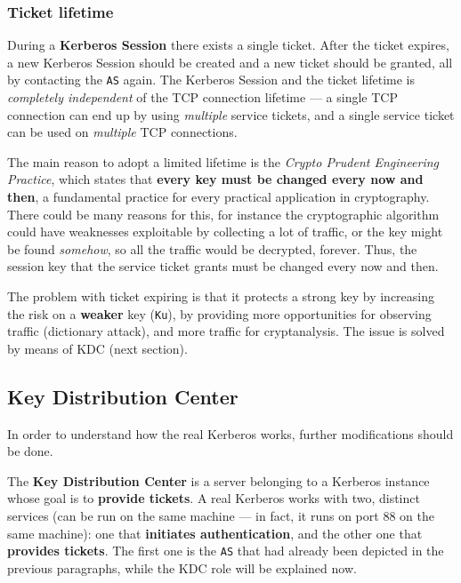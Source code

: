 \documentclass[10pt]{\classname}
\begin{document}
\subsubsection{Ticket lifetime}

During a \textbf{Kerberos Session} there exists a single ticket. After the
ticket expires, a new Kerberos Session should be created and a new ticket
should be granted, all by contacting the \texttt{AS} again. The Kerberos
Session and the ticket lifetime is \emph{completely independent} of the TCP
connection lifetime --- a single TCP connection can end up by using
\emph{multiple} service tickets, and a single service ticket can be used on
\emph{multiple} TCP connections.

The main reason to adopt a limited lifetime is the \emph{Crypto Prudent
Engineering Practice}, which states that \textbf{every key must be changed
every now and then}, a fundamental practice for every practical application in
cryptography. There could be many reasons for this, for instance the
cryptographic algorithm could have weaknesses exploitable by collecting a lot
of traffic, or the key might be found \emph{somehow}, so all the traffic would
be decrypted, forever. Thus, the session key that the service ticket grants
must be changed every now and then.

The problem with ticket expiring is that it protects a strong key by increasing
the risk on a \textbf{weaker} key (\texttt{Ku}), by providing more
opportunities for observing traffic (dictionary attack), and more traffic for
cryptanalysis. The issue is solved by means of KDC (next section).

\subsection{Key Distribution Center}

In order to understand how the real Kerberos works, further modifications
should be done.

The \textbf{Key Distribution Center} is a server belonging to a Kerberos instance
whose goal is to \textbf{provide tickets}. A real Kerberos works with two,
distinct services (can be run on the same machine --- in fact, it runs on port
88 on the same machine): one that \textbf{initiates authentication}, and the
other one that \textbf{provides tickets}. The first one is the \texttt{AS} that
had already been depicted in the previous paragraphs, while the KDC role will
be explained now.
\end{document}
